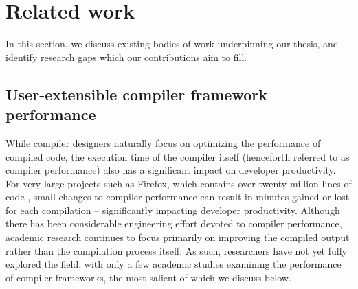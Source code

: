 \chapter{Related work}
\label{chap:related-work}

%
%

In this section, we discuss existing bodies of work underpinning our thesis, and identify research gaps which our contributions aim to fill.


\section{User-extensible compiler framework performance}
\label{sec:perf-user-extensible-frameworks}

While compiler designers naturally focus on optimizing the performance of compiled code, the execution time of the compiler itself (henceforth referred to as compiler performance) also has a significant impact on developer productivity.
For very large projects such as Firefox, which contains over twenty million lines of code \cite{bastienabadieEngineeringCodeQuality}, small changes to compiler performance can result in minutes gained or lost for each compilation -- significantly impacting developer productivity. Although there has been considerable engineering effort devoted to compiler performance, academic research continues to focus primarily on improving the compiled output rather than the compilation process itself.
As such, researchers have not yet fully explored the field, with only a few academic studies examining the performance of compiler frameworks, the most salient of which we discuss below.

